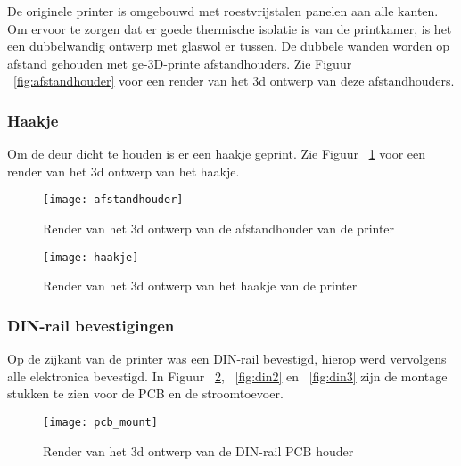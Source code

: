 De originele printer is omgebouwd met roestvrijstalen panelen aan alle kanten.
Om ervoor te zorgen dat er goede thermische isolatie is van de printkamer, is
het een dubbelwandig ontwerp met glaswol er tussen. De dubbele wanden worden op
afstand gehouden met ge-3D-printe afstandhouders. Zie Figuur
~\ref{fig:afstandhouder} voor een render van het \ac{3d} ontwerp van deze
afstandhouders.

\subsubsection{Haakje}

Om de deur dicht te houden is er een haakje geprint. Zie Figuur
~\ref{fig:haakje} voor een render van het \ac{3d} ontwerp van het haakje.

\begin{figure}[h]
    \centering
    \begin{minipage}{0.45\textwidth}
        \centerline{\texttt{[image: afstandhouder]}}
        \caption{Render van het \ac{3d} ontwerp van de afstandhouder van de printer}
        \label{fig:afstandhouder}
    \end{minipage}\hfill
    \begin{minipage}{0.45\textwidth}
        \centerline{\texttt{[image: haakje]}}
        \caption{Render van het \ac{3d} ontwerp van het haakje van de printer}
        \label{fig:haakje}
    \end{minipage}
\end{figure}

\subsubsection{DIN-rail bevestigingen}

Op de zijkant van de printer was een DIN-rail bevestigd, hierop werd vervolgens
alle elektronica bevestigd. In Figuur ~\ref{fig:din1}, ~\ref{fig:din2} en
~\ref{fig:din3} zijn de montage stukken te zien voor de PCB en de
stroomtoevoer.

\begin{figure}[h]
    \centerline{\texttt{[image: pcb\_mount]}}
    \caption{Render van het \ac{3d} ontwerp van de DIN-rail PCB houder}
    \label{fig:din1}
\end{figure}


